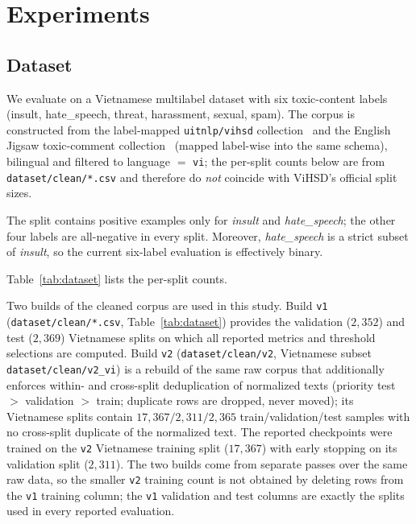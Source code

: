 \documentclass[runningheads]{llncs}
\begin{document}
\section{Experiments}
\label{sec:experiments}

\subsection{Dataset}
\label{sec:dataset}

We evaluate on a Vietnamese multilabel dataset with six toxic-content labels (insult, hate\_speech, threat, harassment, sexual, spam). The corpus is constructed from the label-mapped \texttt{uitnlp/vihsd} collection~\cite{luu2021} and the English Jigsaw toxic-comment collection~\cite{jigsaw2018} (mapped label-wise into the same schema), bilingual and filtered to language $=$ \texttt{vi}; the per-split counts below are from \texttt{dataset/clean/*.csv} and therefore do \emph{not} coincide with ViHSD's official split sizes.

The split contains positive examples only for \emph{insult} and \emph{hate\_speech}; the other four labels are all-negative in every split. Moreover, \emph{hate\_speech} is a strict subset of \emph{insult}, so the current six-label evaluation is effectively binary.

Table~\ref{tab:dataset} lists the per-split counts.

Two builds of the cleaned corpus are used in this study. Build \texttt{v1} (\texttt{dataset/clean/*.csv}, Table~\ref{tab:dataset}) provides the validation ($2{,}352$) and test ($2{,}369$) Vietnamese splits on which all reported metrics and threshold selections are computed. Build \texttt{v2} (\texttt{dataset/clean/v2}, Vietnamese subset \texttt{dataset/clean/v2\_vi}) is a rebuild of the same raw corpus that additionally enforces within- and cross-split deduplication of normalized texts (priority test $>$ validation $>$ train; duplicate rows are dropped, never moved); its Vietnamese splits contain $17{,}367/2{,}311/2{,}365$ train/validation/test samples with no cross-split duplicate of the normalized text. The reported checkpoints were trained on the \texttt{v2} Vietnamese training split ($17{,}367$) with early stopping on its validation split ($2{,}311$). The two builds come from separate passes over the same raw data, so the smaller \texttt{v2} training count is not obtained by deleting rows from the \texttt{v1} training column; the \texttt{v1} validation and test columns are exactly the splits used in every reported evaluation.
\end{document}
